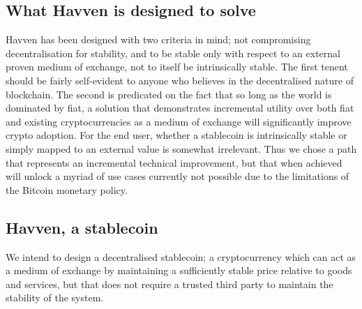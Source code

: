 \subsection{What Havven is designed to solve}

\noindent Havven has been designed with two criteria in mind; not compromising decentralisation for stability, and to be stable only with respect to an external proven medium of exchange, not to itself be intrinsically stable. The first tenent should be fairly self-evident to anyone who believes in the decentralised nature of blockchain. The second is predicated on the fact that so long as the world is dominated by fiat, a solution that demonstrates incremental utility over both fiat and existing cryptocurrencies as a medium of exchange will significantly improve crypto adoption. For the end user, whether a stablecoin is intrinsically stable or simply mapped to an external value is somewhat irrelevant. Thus we chose a path that represents an incremental technical improvement, but that when achieved will unlock a myriad of use cases currently not possible due to the limitations of the Bitcoin monetary policy. \\

\subsection{Havven, a stablecoin}

\noindent We intend to design a decentralised stablecoin; a cryptocurrency which can act as a medium of exchange by maintaining a sufficiently stable price relative to goods and services, but that does not require a trusted third party to maintain the stability of the system.\\

